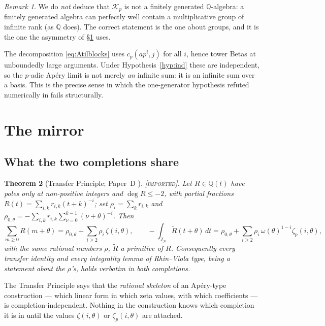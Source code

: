 \documentclass[11pt,reqno]{article}
\newcommand{\Zp}{\mathbb{Z}_p}
\newcommand{\QQ}{\mathbb{Q}}
\newcommand{\Kalg}{\mathcal{K}_p}
\newcommand{\IMPORTED}{{\normalfont\textsc{[imported]}}}
\theoremstyle{plain}
\newtheorem{theorem}{Theorem}[section]
\theoremstyle{definition}
\theoremstyle{remark}
\newtheorem{remark}[theorem]{Remark}
\numberwithin{equation}{section}
\begin{document}
\begin{remark}
We do \emph{not} deduce that $\Kalg$ is not a finitely generated $\QQ$-algebra:
a finitely generated algebra can perfectly well contain a multiplicative group
of infinite rank (as $\QQ$ does).  The correct statement is the one about
groups, and it is the one the asymmetry of \S\ref{sec:mirror} uses.
\end{remark}

The decomposition \eqref{eq:Atilblocks} uses $c_p(ap^i,j)$ for all $i$, hence
tower Betas at unboundedly large arguments.  Under
Hypothesis~\ref{hyp:ind} these are independent, so the $p$-adic Ap\'ery limit is
not merely \emph{an} infinite sum: it is an infinite sum over a basis.  This is
the precise sense in which the one-generator hypothesis refuted numerically in
\cite[\S6.6]{PaperC} fails structurally.

\section{The mirror}\label{sec:mirror}

\subsection{What the two completions share}

\begin{theorem}[Transfer Principle; Paper~D \cite{PaperD}]\label{thm:transfer}
\IMPORTED.  Let $R\in\QQ(t)$ have poles only at non-positive integers and
$\deg R\le-2$, with partial fractions $R(t)=\sum_{i,k}r_{i,k}(t+k)^{-i}$; set
$\rho_i=\sum_kr_{i,k}$ and
$\rho_{0,\theta}=-\sum_{i,k}r_{i,k}\sum_{\nu=0}^{k-1}(\nu+\theta)^{-i}$.  Then
\[
  \sum_{m\ge0}R(m+\theta)=\rho_{0,\theta}+\sum_{i\ge2}\rho_i\,\zeta(i,\theta),
  \qquad
  -\int_{\Zp}\widetilde R(t+\theta)\,dt
   =\rho_{0,\theta}+\sum_{i\ge2}\rho_i\,\omega(\theta)^{1-i}\zeta_p(i,\theta),
\]
with the \emph{same} rational numbers $\rho$, $\widetilde R$ a primitive of $R$.
Consequently every transfer identity and every integrality lemma of
Rhin--Viola type, being a statement about the $\rho$'s, holds verbatim in both
completions.
\end{theorem}

The Transfer Principle says that the \emph{rational skeleton} of an Ap\'ery-type
construction --- which linear form in which zeta values, with which coefficients
--- is completion-independent.  Nothing in the construction knows which
completion it is in until the values $\zeta(i,\theta)$ or $\zeta_p(i,\theta)$ are
attached.
\end{document}
